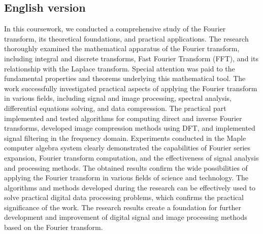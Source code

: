 \subsection*{English version}
In this coursework, we conducted a comprehensive study of the Fourier transform, its theoretical foundations, and practical applications. The research thoroughly examined the mathematical apparatus of the Fourier transform, including integral and discrete transforms, Fast Fourier Transform (FFT), and its relationship with the Laplace transform. Special attention was paid to the fundamental properties and theorems underlying this mathematical tool. The work successfully investigated practical aspects of applying the Fourier transform in various fields, including signal and image processing, spectral analysis, differential equations solving, and data compression. The practical part implemented and tested algorithms for computing direct and inverse Fourier transforms, developed image compression methods using DFT, and implemented signal filtering in the frequency domain. Experiments conducted in the Maple computer algebra system clearly demonstrated the capabilities of Fourier series expansion, Fourier transform computation, and the effectiveness of signal analysis and processing methods. The obtained results confirm the wide possibilities of applying the Fourier transform in various fields of science and technology. The algorithms and methods developed during the research can be effectively used to solve practical digital data processing problems, which confirms the practical significance of the work. The research results create a foundation for further development and improvement of digital signal and image processing methods based on the Fourier transform.



